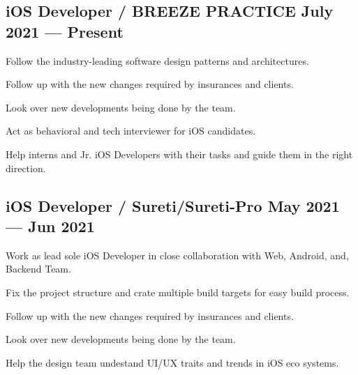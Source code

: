 \documentclass[letter,10pt]{article}
\begin{document}
\subsection{{iOS Developer / BREEZE PRACTICE \hfill July 2021 --- Present}}
\begin{zitemize}
\item Follow the industry-leading software design patterns and architectures.
\item Follow up with the new changes required by insurances and clients.
\item Look over new developments being done by the team.
\item Act as behavioral and tech interviewer for iOS candidates.
\item Help interns and Jr. iOS Developers with their tasks and guide them in the right direction.
\end{zitemize}

\subsection{{iOS Developer / Sureti/Sureti-Pro \hfill May 2021 --- Jun 2021}}
\begin{zitemize}
\item Work as lead sole iOS Developer in close collaboration with Web, Android, and, Backend Team.
\item Fix the project structure and crate multiple build targets for easy build process.
\item Follow up with the new changes required by insurances and clients.
\item Look over new developments being done by the team.
\item Help the design team undestand UI/UX traits and trends in iOS eco systems.
\end{zitemize}

\end{document}
